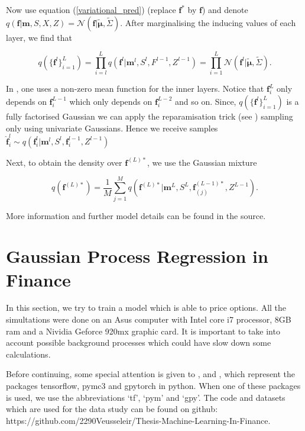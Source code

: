 \documentclass[12pt,a4paper,oneside]{book}
\begin{document}
Now use equation (\ref{variational_pred}) (replace $\bm{f}^{\ast}$ by $\bm{f}$) and denote $q(\bm{f}|\bm{m}, S,X,Z ) = \mathcal{N}(\bm{f}| \bm{\tilde{\mu}}, \tilde{\Sigma})$. After marginalising the inducing values of each layer, we find that

\begin{equation}
q (\{ \bm{f}^l \}_{i=1}^L) = \prod\limits_{i=l}^L q(\bm{f}^l | \bm{m}^l, S^l, F^{l-1}, Z^{l-1}) =  \prod\limits_{i=1}^L \mathcal{N}(\bm{f}^l | \bm{\tilde{\mu}} , \tilde{\Sigma}).
\end{equation}

In \cite{salimbeni2017doubly}, one uses a non-zero mean function for the inner layers. Notice that $\bm{f}^{L}_i$ only depends on $\bm{f}_i^{L-1}$ which only depends on $\bm{f}_i^{L-2}$ and so on. Since, $q (\{ \bm{f}^l \}_{i=1}^L)$ is a fully factorised Gaussian we can apply the reparamisation trick (see \cite{kingma2015variational}) sampling only using univariate Gaussians. Hence we receive samples $\hat{\bm{f}}_i^l \sim q(\bm{f}_i^l| \bm{m}^l, S^l, \bm{f}_i^{l-1} , Z^{l-1})$ 

Next, to obtain the density over $\bm{f}^{(L) {\ast}}$, we use the Gaussian mixture

\begin{equation}
q(\bm{f}^{(L) {\ast}}) = \dfrac{1}{M} \sum\limits_{j=1}^M q(\bm{f}^{(L) {\ast}} | \bm{m}^L, S^L, \bm{f}^{(L-1) \ast}_{(j)}, Z^{L-1}).
\end{equation}

More information and further model details can be found in the source.







\chapter{Gaussian Process Regression in Finance} \label{GPR_in finance}

In this section, we try to train a model which is able to price options. All the simultations were done on an Asus computer with Intel core i7 processor, 8GB ram and a Nividia Geforce 920mx graphic card. It is important to take into account possible background processes which could have slow down some calculations.

Before continuing, some special attention is given to  \cite{abadi2016tensorflow},  \cite{salvatier2016probabilistic} and \cite{gardner2018gpytorch}, which represent the packages tensorflow, pymc3 and gpytorch in python. When one of these packages is used, we use the abbreviations `tf', `pym' and `gpy'. The code and datasets which are used for the data study can be found on github: https://github.com/2290Veusseleir/Thesis-Machine-Learning-In-Finance.
\end{document}
